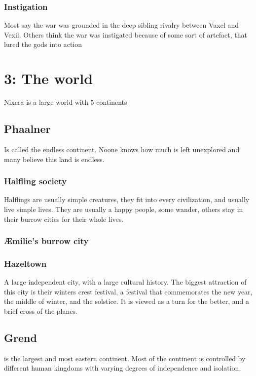 \documentclass[a4paper]{article}
\begin{document}
\subsubsection{Instigation}
Most say the war was grounded in the deep sibling rivalry between Vaxel and Vexil. Others think the war was instigated because of some sort of artefact, that lured the gods into action 
\section{3: The world}
Nixera is a large world with 5 continents
\subsection{Phaalner}
Is called the endless continent. Noone knows how much is left unexplored and many believe this land is endless.

\subsubsection{Halfling society}
Halflings are usually simple creatures, they fit into every civilization, and usually live simple lives. They are usually a happy people, some wander, others stay in their burrow cities for their whole lives. 

\subsubsection{Æmilie's burrow city}

\subsubsection{Hazeltown}
A large independent city, with a large cultural history. The biggest attraction of this city is their winters crest festival, a festival that commemorates the new year, the middle of winter, and the solstice. It is viewed as a turn for the better, and a brief cross of the planes.

\subsection{Grend}
is the largest and most eastern continent. Most of the continent is controlled by different human kingdoms with varying degrees of independence and isolation.
\end{document}

